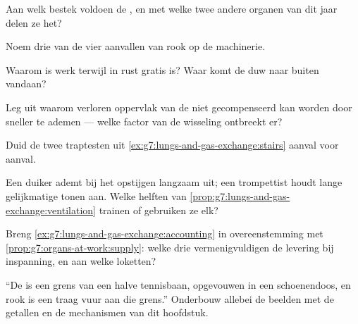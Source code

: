 \begin{exercise}[$\star$]\label{exo:g7:lungs-and-gas-exchange:5}
Aan welk bestek voldoen de , en met welke twee andere organen
van dit jaar delen ze het?
\end{exercise}

\begin{exercise}[$\star$]\label{exo:g7:lungs-and-gas-exchange:6}
Noem drie van de vier aanvallen van rook op de machinerie.
\end{exercise}

\begin{exercise}[$\star\star$]\label{exo:g7:lungs-and-gas-exchange:7}
Waarom is  werk terwijl  in rust gratis is? Waar komt de
duw naar buiten vandaan?
\end{exercise}

\begin{exercise}[$\star\star$]\label{exo:g7:lungs-and-gas-exchange:8}
Leg uit waarom verloren oppervlak van de  niet gecompenseerd
kan worden door sneller te ademen --- welke factor van de wisseling
ontbreekt er?
\end{exercise}

\begin{exercise}[$\star\star$]\label{exo:g7:lungs-and-gas-exchange:9}
Duid de twee traptesten uit
\cref{ex:g7:lungs-and-gas-exchange:stairs} aanval voor aanval.
\end{exercise}

\begin{exercise}[$\star\star$]\label{exo:g7:lungs-and-gas-exchange:10}
Een duiker ademt bij het opstijgen langzaam uit; een trompettist houdt
lange gelijkmatige tonen aan. Welke helften van
\cref{prop:g7:lungs-and-gas-exchange:ventilation} trainen of gebruiken ze
elk?
\end{exercise}

\begin{exercise}[$\star\star$]\label{exo:g7:lungs-and-gas-exchange:11}
Breng \cref{ex:g7:lungs-and-gas-exchange:accounting} in overeenstemming
met \cref{prop:g7:organs-at-work:supply}: welke drie 
vermenigvuldigen de levering bij inspanning, en aan welke loketten?
\end{exercise}

\begin{exercise}[$\star\star\star$]\label{exo:g7:lungs-and-gas-exchange:12}
``De  is een grens van een halve tennisbaan, opgevouwen in een
schoenendoos, en rook is een traag vuur aan die grens.'' Onderbouw allebei
de beelden met de getallen en de mechanismen van dit hoofdstuk.
\end{exercise}

